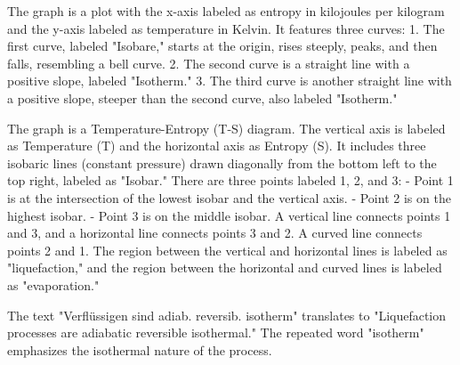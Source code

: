 The graph is a plot with the x-axis labeled as entropy in kilojoules per kilogram and the y-axis labeled as temperature in Kelvin. It features three curves:
1. The first curve, labeled "Isobare," starts at the origin, rises steeply, peaks, and then falls, resembling a bell curve.
2. The second curve is a straight line with a positive slope, labeled "Isotherm."
3. The third curve is another straight line with a positive slope, steeper than the second curve, also labeled "Isotherm."

The graph is a Temperature-Entropy (T-S) diagram. The vertical axis is labeled as Temperature (T) and the horizontal axis as Entropy (S). It includes three isobaric lines (constant pressure) drawn diagonally from the bottom left to the top right, labeled as "Isobar." There are three points labeled 1, 2, and 3:
- Point 1 is at the intersection of the lowest isobar and the vertical axis.
- Point 2 is on the highest isobar.
- Point 3 is on the middle isobar.
A vertical line connects points 1 and 3, and a horizontal line connects points 3 and 2. A curved line connects points 2 and 1. The region between the vertical and horizontal lines is labeled as "liquefaction," and the region between the horizontal and curved lines is labeled as "evaporation."

The text "Verflüssigen sind adiab. reversib. isotherm" translates to "Liquefaction processes are adiabatic reversible isothermal." The repeated word "isotherm" emphasizes the isothermal nature of the process.